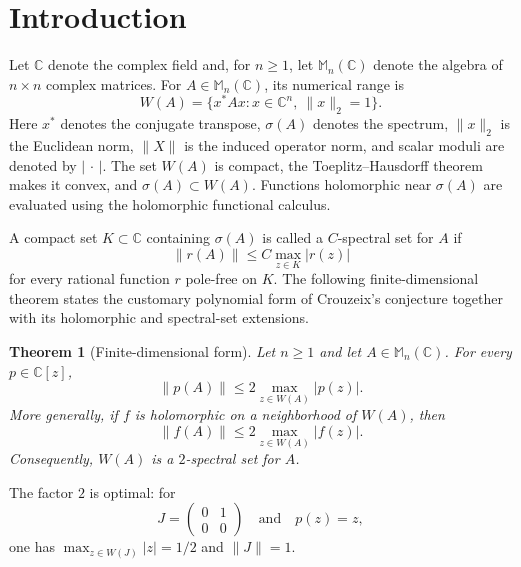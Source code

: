 \documentclass[preprints,article,submit,oneauthor]{Definitions/mdpi}
\newcounter{manuscriptresult}[section]
\theoremstyle{mdpi}
\newtheorem{theorem}[manuscriptresult]{Theorem}
\theoremstyle{definition}
\newcommand{\C}{\mathbb C}
\newcommand{\Mn}{\mathbb M_n(\C)}
\begin{document}
\section{Introduction}
\label{sec:introduction}

Let $\C$ denote the complex field and, for $n\geq1$, let $\Mn$ denote
the algebra of $n\times n$ complex matrices.  For $A\in\Mn$, its
numerical range is
\begin{equation}
  W(A)=\{x^*Ax:x\in\C^n,\ \lVert x\rVert_2=1\}.
  \label{eq:numerical-range}
\end{equation}
Here $x^*$ denotes the conjugate transpose, $\sigma(A)$ denotes the
spectrum, $\lVert x\rVert_2$ is the Euclidean norm, $\lVert X\rVert$ is
the induced operator norm, and scalar moduli are denoted by
$\lvert\,\cdot\,\rvert$.  The set $W(A)$ is compact, the
Toeplitz--Hausdorff theorem makes it convex, and
$\sigma(A)\subset W(A)$.  Functions holomorphic near $\sigma(A)$ are
evaluated using the holomorphic functional calculus.

A compact set $K\subset\C$ containing $\sigma(A)$ is called a
$C$-spectral set for $A$ if
\begin{equation}
  \lVert r(A)\rVert\leq C\max_{z\in K}\lvert r(z)\rvert
  \label{eq:spectral-set-definition}
\end{equation}
for every rational function $r$ pole-free on $K$.  The following
finite-dimensional theorem states the customary polynomial form of
Crouzeix's conjecture together with its holomorphic and spectral-set
extensions.

\begin{theorem}[Finite-dimensional form]
\label{thm:main}
Let $n\geq1$ and let $A\in\Mn$.  For every $p\in\C[z]$,
\begin{equation}
  \lVert p(A)\rVert
  \leq2\max_{z\in W(A)}\lvert p(z)\rvert.
  \label{eq:matrix-polynomial-bound}
\end{equation}
More generally, if $f$ is holomorphic on a neighborhood of $W(A)$,
then
\begin{equation}
  \lVert f(A)\rVert
  \leq2\max_{z\in W(A)}\lvert f(z)\rvert.
  \label{eq:main-bound}
\end{equation}
Consequently, $W(A)$ is a $2$-spectral set for $A$.
\end{theorem}

The factor $2$ is optimal: for
\begin{equation}
  J=\begin{pmatrix}0&1\\0&0\end{pmatrix}
  \quad\text{and}\quad p(z)=z,
  \label{eq:sharp-example}
\end{equation}
one has
$\max_{z\in W(J)}\lvert z\rvert=1/2$ and $\lVert J\rVert=1$.
\end{document}
